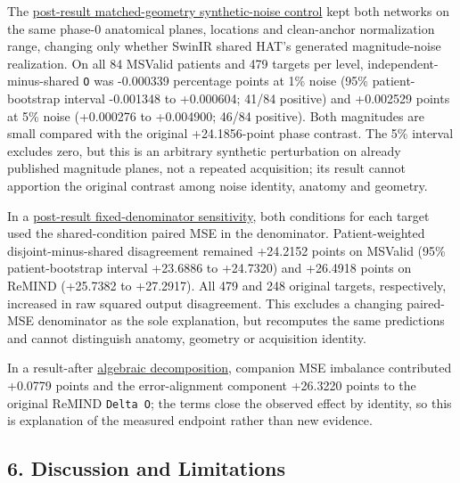 \documentclass[
]{article}
\begin{document}
The
\href{MSVALID_MATCHED_GEOMETRY_NOISE_CONTROL_RESULT_2026-10-01.md}{post-result
matched-geometry synthetic-noise control} kept both networks on the same
phase-0 anatomical planes, locations and clean-anchor normalization
range, changing only whether SwinIR shared HAT's generated
magnitude-noise realization. On all 84 MSValid patients and 479 targets
per level, independent-minus-shared \texttt{O} was -0.000339 percentage
points at 1\% noise (95\% patient-bootstrap interval -0.001348 to
+0.000604; 41/84 positive) and +0.002529 points at 5\% noise (+0.000276
to +0.004900; 46/84 positive). Both magnitudes are small compared with
the original +24.1856-point phase contrast. The 5\% interval excludes
zero, but this is an arbitrary synthetic perturbation on already
published magnitude planes, not a repeated acquisition; its result
cannot apportion the original contrast among noise identity, anatomy and
geometry.

In a
\href{FIXED_DENOMINATOR_TWO_SOURCE_RESULT_2026-10-01.md}{post-result
fixed-denominator sensitivity}, both conditions for each target used the
shared-condition paired MSE in the denominator. Patient-weighted
disjoint-minus-shared disagreement remained +24.2152 points on MSValid
(95\% patient-bootstrap interval +23.6886 to +24.7320) and +26.4918
points on ReMIND (+25.7382 to +27.2917). All 479 and 248 original
targets, respectively, increased in raw squared output disagreement.
This excludes a changing paired-MSE denominator as the sole explanation,
but recomputes the same predictions and cannot distinguish anatomy,
geometry or acquisition identity.

In a result-after
\href{REMIND_ERROR_ALIGNMENT_DECOMPOSITION_RESULT_2026-10-01.md}{algebraic
decomposition}, companion MSE imbalance contributed +0.0779 points and
the error-alignment component +26.3220 points to the original ReMIND
\texttt{Delta\ O}; the terms close the observed effect by identity, so
this is explanation of the measured endpoint rather than new evidence.

\subsection{6. Discussion and
Limitations}\label{discussion-and-limitations}
\end{document}
